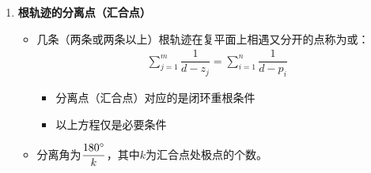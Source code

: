 \begin{enumerate}
	\item \textbf{根轨迹的分离点（汇合点）}
	\begin{itemize}
		\item 几条（两条或两条以上）根轨迹在复平面上相遇又分开的点称为或：
		\begin{align}
			\sum_{j = 1}^{m} \dfrac{1}{d - z_j} = \sum_{i =1}^{n}\dfrac{1}{d - p_i}
		\end{align}
	\begin{itemize}
		\item 分离点（汇合点）对应的是闭环重根条件
		\item 以上方程仅是必要条件
	\end{itemize}
	\item 分离角为$\dfrac{180 {}^{\circ}}{k}$，其中$k$为汇合点处极点的个数。
	\end{itemize}


\end{enumerate}
